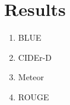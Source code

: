 \section{Results}
\label{sec:results}

\begin{enumerate}
\item BLUE \cite{Papineni2002}
\item CIDEr-D \cite{vedantam2014cider}
\item Meteor \cite{lavie2014meteor}
\item ROUGE \cite{Lin2004a}
\end{enumerate}